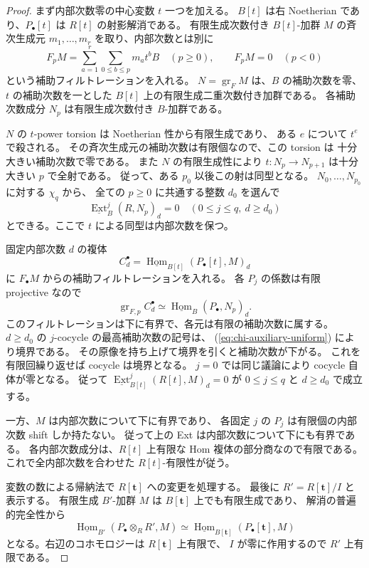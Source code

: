 \begin{proof}
まず内部次数零の中心変数 $t$ 一つを加える。
$B[t]$ は右 Noetherian であり、$P_\bullet[t]$ は
$R[t]$ の射影解消である。
有限生成次数付き $B[t]$-加群 $M$ の斉次生成元
$m_1,\ldots,m_r$ を取り、内部次数とは別に
\[
 F_pM=\sum_{a=1}^r\sum_{0\le b\le p}m_a t^bB
 \quad(p\ge0),\qquad F_pM=0\quad(p<0)
\]
という補助フィルトレーションを入れる。
$N=\operatorname{gr}_F M$ は、$B$ の補助次数を零、
$t$ の補助次数を一とした $B[t]$ 上の有限生成二重次数付き加群である。
各補助次数成分 $N_p$ は有限生成次数付き $B$-加群である。

$N$ の $t$-power torsion は Noetherian 性から有限生成であり、
ある $e$ について $t^e$ で殺される。
その斉次生成元の補助次数は有限個なので、この torsion は
十分大きい補助次数で零である。
また $N$ の有限生成性により
$t:N_p\to N_{p+1}$ は十分大きい $p$ で全射である。
従って、ある $p_0$ 以後この射は同型となる。
$N_0,\ldots,N_{p_0}$ に対する $\chi_q$ から、
全ての $p\ge0$ に共通する整数 $d_0$ を選んで
\[
 \underline{\operatorname{Ext}}_B^j(R,N_p)_d=0
 \quad(0\le j\le q,\ d\ge d_0)
 \tag{Chi-aux}\label{eq:chi-auxiliary-uniform}
\]
とできる。ここで $t$ による同型は内部次数を保つ。

固定内部次数 $d$ の複体
\[
 C_d^\bullet=
 \underline{\operatorname{Hom}}_{B[t]}(P_\bullet[t],M)_d
\]
に $F_\bullet M$ からの補助フィルトレーションを入れる。
各 $P_j$ の係数は有限 projective なので
\[
 \operatorname{gr}_{F,p} C_d^\bullet
 \simeq\underline{\operatorname{Hom}}_B(P_\bullet,N_p)_d.
\]
このフィルトレーションは下に有界で、各元は有限の補助次数に属する。
$d\ge d_0$ の $j$-cocycle の最高補助次数の記号は、
(\ref{eq:chi-auxiliary-uniform}) により境界である。
その原像を持ち上げて境界を引くと補助次数が下がる。
これを有限回繰り返せば cocycle は境界となる。
$j=0$ では同じ議論により cocycle 自体が零となる。
従って $\underline{\operatorname{Ext}}_{B[t]}^j(R[t],M)_d=0$
が $0\le j\le q$ と $d\ge d_0$ で成立する。

一方、$M$ は内部次数について下に有界であり、
各固定 $j$ の $P_j$ は有限個の内部次数 shift しか持たない。
従って上の Ext は内部次数について下にも有界である。
各内部次数成分は、$R[t]$ 上有限な Hom 複体の部分商なので有限である。
これで全内部次数を合わせた $R[t]$-有限性が従う。

変数の数による帰納法で $R[\mathbf t]$ への変更を処理する。
最後に $R'=R[\mathbf t]/I$ と表示する。
有限生成 $B'$-加群 $M$ は $B[\mathbf t]$ 上でも有限生成であり、
解消の普遍的完全性から
\[
 \underline{\operatorname{Hom}}_{B'}
       (P_\bullet\otimes_RR',M)
 \simeq
 \underline{\operatorname{Hom}}_{B[\mathbf t]}
       (P_\bullet[\mathbf t],M)
\]
となる。右辺のコホモロジーは $R[\mathbf t]$ 上有限で、
$I$ が零に作用するので $R'$ 上有限である。
\end{proof}

